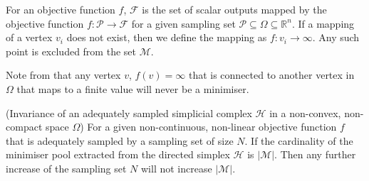 \begin{definition} \label{def:hnew}
For an objective function $f$, $\mathcal{F}$ is the set of scalar outputs mapped by the objective function $f:\mathcal{P} \rightarrow \mathcal{F}$ for a given sampling set $\mathcal{P} \subseteq \Omega \subseteq \mathbb{R}^n$. If a mapping of a vertex $v_i$ does not exist, then we define the mapping as $f: v_i \rightarrow \infty$.  Any such point is excluded from the set $\mathcal{M}$.
\end{definition}

Note from  that any vertex $v$, $f(v) = \infty$ that is connected to another vertex in $\Omega$ that maps to a finite value will never be a minimiser.

\begin{theorem} \label{theorem:invariance_n} (Invariance of an adequately sampled simplicial complex $\mathcal{H}$ in a non-convex, non-compact space $\Omega$) For a given non-continuous, non-linear objective function $f$ that is adequately sampled by a sampling set of size $N$. If the cardinality of the minimiser pool extracted from the directed simplex $\mathcal{H}$ is $|\mathcal{M}|$. Then any further increase of the sampling set $N$ will not increase $|\mathcal{M}|$.
\end{theorem}

